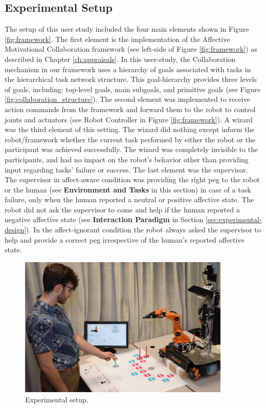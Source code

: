 \documentclass[12pt]{report}
\begin{document}
\subsection{Experimental Setup}
The setup of this user study included the four main elements shown in Figure
\ref{fig:framework}. The first element is the implementation of the Affective
Motivational Collaboration framework (see left-side of Figure
\ref{fig:framework}) as described in Chapter \ref{ch:appraisals}. In this
user-study, the Collaboration mechanism in our framework uses a hierarchy of
goals associated with tasks in the hierarchical task network structure. This
goal-hierarchy provides three levels of goals, including: top-level goals,
main subgoals, and primitive goals (see Figure
\ref{fig:collaboration_structure}). The second element was implemented to
receive action commands from the framework and forward them to the robot to
control joints and actuators (see Robot Controller in Figure
\ref{fig:framework}). A wizard was the third element of this setting. The wizard
did nothing except inform the robot/framework whether the current task performed
by either the robot or the participant was achieved successfully. The wizard was
completely invisible to the participants, and had no impact on the robot's
behavior other than providing input regarding tasks' failure or success. The
last element was the supervisor. The supervisor in affect-aware condition was
providing the right peg to the robot or the human (see \textbf{Environment and
Tasks} in this section) in case of a task failure, only when the human
reported a neutral or positive affective state. The robot did not ask the
supervisor to come and help if the human reported a negative affective state
(see \textbf{Interaction Paradigm} in Section \ref{sec:experimental-design}). In
the affect-ignorant condition the robot always asked the supervisor to help and
provide a correct peg irrespective of the human's reported affective state.

\begin{figure}
  \centering
  \includegraphics[width=0.9\textwidth]{figure/environment.png}
  \caption{Experimental setup.}
  \label{fig:environment}
\end{figure}
\end{document}
